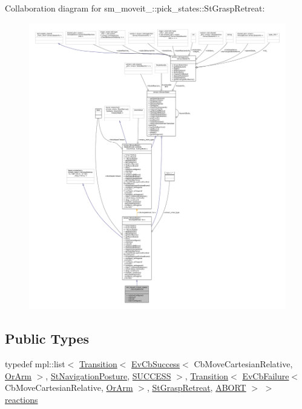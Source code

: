 Collaboration diagram for sm\+\_\+moveit\+\_\+:\+:pick\+\_\+states\+:\+:St\+Grasp\+Retreat\+:
\nopagebreak
\begin{figure}[H]
\begin{center}
\leavevmode
\includegraphics[width=350pt]{structsm__moveit__4_1_1pick__states_1_1StGraspRetreat__coll__graph}
\end{center}
\end{figure}
\subsection*{Public Types}
\begin{DoxyCompactItemize}
\item 
typedef mpl\+::list$<$ \hyperlink{classsmacc_1_1Transition}{Transition}$<$ \hyperlink{structsmacc_1_1EvCbSuccess}{Ev\+Cb\+Success}$<$ Cb\+Move\+Cartesian\+Relative, \hyperlink{classsm__moveit__4_1_1OrArm}{Or\+Arm} $>$, \hyperlink{structsm__moveit__4_1_1pick__states_1_1StNavigationPosture}{St\+Navigation\+Posture}, \hyperlink{structsmacc_1_1default__transition__tags_1_1SUCCESS}{S\+U\+C\+C\+E\+SS} $>$, \hyperlink{classsmacc_1_1Transition}{Transition}$<$ \hyperlink{structsmacc_1_1EvCbFailure}{Ev\+Cb\+Failure}$<$ Cb\+Move\+Cartesian\+Relative, \hyperlink{classsm__moveit__4_1_1OrArm}{Or\+Arm} $>$, \hyperlink{structsm__moveit__4_1_1pick__states_1_1StGraspRetreat}{St\+Grasp\+Retreat}, \hyperlink{structsmacc_1_1default__transition__tags_1_1ABORT}{A\+B\+O\+RT} $>$ $>$ \hyperlink{structsm__moveit__4_1_1pick__states_1_1StGraspRetreat_a8636f6a099bdb79aaac485b188fd833b}{reactions}
\end{DoxyCompactItemize}
